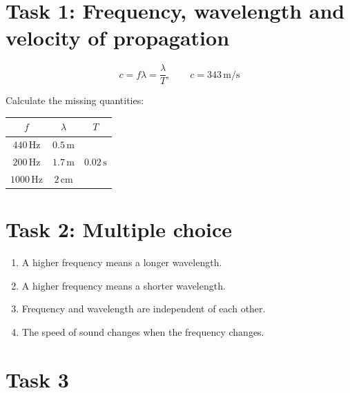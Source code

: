 \documentclass[a4paper,12pt]{article}
\begin{document}

\section*{Task 1: Frequency, wavelength and velocity of propagation}

\[
c = f\lambda = \frac{\lambda}{T},
\qquad
c = 343\,\mathrm{m/s}
\]

Calculate the missing quantities:

\begin{center}
\renewcommand{\arraystretch}{1.5}
\begin{tabular}{c|c|c}
$f$ & $\lambda$ & $T$ \\ \hline
$440\,\mathrm{Hz}$ & $0.5\,\mathrm{m}$ & \\[2mm]
$200\,\mathrm{Hz}$ & $1.7\,\mathrm{m}$ & $0.02\,\mathrm{s}$ \\[2mm]
$1000\,\mathrm{Hz}$ & $2\,\mathrm{cm}$ &
\end{tabular}
\end{center}



\section*{Task 2: Multiple choice}

\begin{enumerate}[label=$\square$]
    \item A higher frequency means a longer wavelength.
    \item A higher frequency means a shorter wavelength.
    \item Frequency and wavelength are independent of each other.
    \item The speed of sound changes when the frequency changes.
\end{enumerate}



\section*{Task 3}
\end{document}
